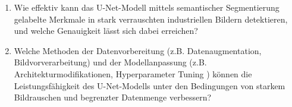 \begin{enumerate}

\item Wie effektiv kann das U-Net-Modell mittels semantischer Segmentierung gelabelte Merkmale in stark verrauschten industriellen Bildern detektieren, und welche Genauigkeit lässt sich dabei erreichen?

\item Welche Methoden der Datenvorbereitung (z.B. Datenaugmentation, Bildvorverarbeitung) und der Modellanpassung (z.B. Architekturmodifikationen, Hyperparameter Tuning ) können die Leistungsfähigkeit des U-Net-Modells unter den Bedingungen von starkem Bildrauschen und begrenzter Datenmenge verbessern?

\end{enumerate}
